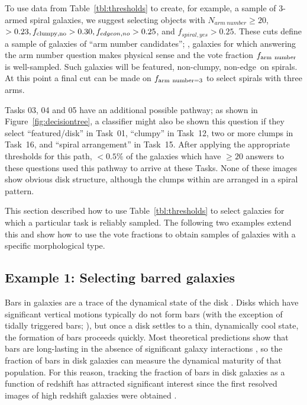 \documentclass[a4paper,fleqn,usenatbib]{mnras}
\begin{document}
To use data from Table~\ref{tbl:thresholds} to create, for example, a sample of  
3-armed spiral galaxies, we suggest selecting objects with $N_{arm~number} \ge
20$, \ffeatures$>0.23, f_{\rm clumpy,no} > 0.30, f_{edgeon,no}>0.25$, and
$f_{spiral,yes}>0.25$. These cuts define a sample of galaxies of ``arm number
candidates''; \ie, galaxies for which answering the arm number question makes
physical sense and the vote fraction $f_{\rm arm~number}$ is well-sampled. 
Such galaxies will be featured, non-clumpy, non-edge~on spirals. At
this point a final cut can be made on $f_{\rm arm~number=3}$ to select spirals with
three arms. 

Tasks 03, 04 and 05 have an additional possible pathway; as shown in
Figure~\ref{fig:decisiontree}, a classifier might also be shown this question
if they select ``featured/disk'' in Task~01, ``clumpy'' in Task~12, two or more
clumps in Task~16, and ``spiral arrangement'' in Task~15. After applying
the appropriate thresholds for this path, $< 0.5\%$ of the galaxies which
have $\ge 20$ answers to these questions used this pathway to arrive at
these Tasks. None of these images show obvious disk
structure, although the clumps within are arranged in a spiral pattern. 

This section described how to use Table~\ref{tbl:thresholds} to select
galaxies for which a particular task is reliably sampled. The
following two examples extend this and show how to use the vote fractions to
obtain samples of galaxies with a specific morphological type.

\subsection{Example 1: Selecting barred galaxies} 

Bars in galaxies are a trace of the dynamical state of the disk
\citep[\eg,][]{com09a,ath12}. Disks which have significant vertical motions
typically do not form bars (with the exception of tidally triggered bars;
\citealt{bar91}), but once a disk settles to a thin, dynamically cool state,
the formation of bars proceeds quickly. Most theoretical predictions show that
bars are long-lasting in the absence of significant galaxy interactions
\citep{ath05}, so the fraction of bars in disk galaxies can measure the
dynamical maturity of that population. For this reason, tracking the fraction
of bars in disk galaxies as a function of redshift has attracted significant
interest since the first resolved images of high redshift galaxies were
obtained \citep[\eg,][]{abr99,elm04,jog04,she08a, mel14,sim14}.
\end{document}
